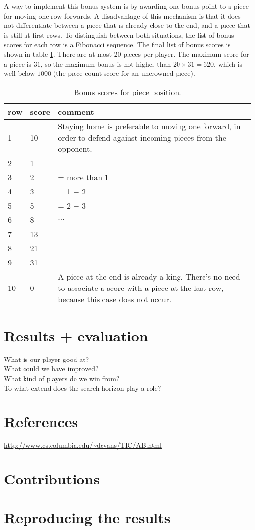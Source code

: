 \documentclass[11pt,a4paper]{article}
\begin{document}
A way to implement this bonus system is by awarding one bonus point to a piece for moving one row forwards. A disadvantage of this mechanism is that it does not differentiate between a piece that is already close to the end, and a piece that is still at first rows. To distinguish between both situations, the list of bonus scores for each row is a Fibonacci sequence. The final list of bonus scores is shown in table \ref{table:bonusscore}. There are at most 20 pieces per player. The maximum score for a piece is $31$, so the maximum bonus is not higher than $20\times 31 = 620$, which is well below $1000$ (the piece count score for an uncrowned piece).

\begin{table}[ht]
\begin{tabularx}{\linewidth}{l|l|X}
row & score & comment \\
\hline
1 & 10 & Staying home is preferable to moving one forward, in order to defend against incoming pieces from the opponent. \\
2 & 1 & \\
3 & 2 & = more than 1 \\
4 & 3 & = 1 + 2\\
5 & 5 & = 2 + 3\\
6 & 8 & $\dots$\\
7 & 13 & \\
8 & 21 & \\
9 & 31 & \\
10 & 0 & A piece at the end is already a king. There's no need to associate a score with a piece at the last row, because this case does not occur. \\
\end{tabularx}
\caption{Bonus scores for piece position.}\label{table:bonusscore}
\end{table}

\section{Results + evaluation}
What is our player good at?\\
What could we have improved?\\
What kind of players do we win from?\\
To what extend does the search horizon play a role? %

\section{References}
\url{http://www.cs.columbia.edu/~devans/TIC/AB.html}
\section{Contributions}
\section{Reproducing the results}
\end{document}
